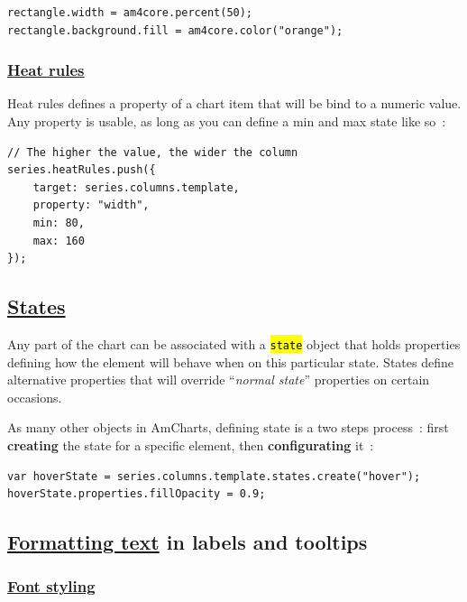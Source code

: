 \documentclass[a4paper,12pt,twoside]{book}
\let\OldTexttt\texttt
\renewcommand{\texttt}[1]{\OldTexttt{\hl{#1}}}
\begin{document}
\begin{lstlisting}
rectangle.width = am4core.percent(50);
rectangle.background.fill = am4core.color("orange");
\end{lstlisting}

				\subsubsection{\href{https://www.amcharts.com/docs/v4/concepts/series/\#Defining_a_heat_rule}{Heat rules}}\label{heat-rules}

Heat rules defines a property of a chart item that will be bind to a numeric value. Any property is usable, as long as you can define a min and max state like so~:

\begin{lstlisting}
// The higher the value, the wider the column
series.heatRules.push({
    target: series.columns.template,
    property: "width",
    min: 80,
    max: 160
});
\end{lstlisting}

			\subsection{\href{https://www.amcharts.com/docs/v4/concepts/states/}{States}}\label{states}

Any part of the chart can be associated with a \texttt{state} object that holds properties defining how the element will behave when on this particular state. States define alternative properties that will override ``\emph{normal state}'' properties on certain occasions.

As many other objects in AmCharts, defining state is a two steps process~: first \textbf{creating} the state for a specific element, then \textbf{configurating} it~:

\begin{lstlisting}
var hoverState = series.columns.template.states.create("hover");
hoverState.properties.fillOpacity = 0.9;
\end{lstlisting}

			\subsection{\href{https://www.amcharts.com/docs/v4/concepts/formatters/formatting-strings/}{Formatting text} in labels and tooltips}\label{formatting-text-in-labels-and-tooltips}

				\subsubsection{\href{https://www.amcharts.com/docs/v4/concepts/formatters/formatting-strings/\#Visual_formatting}{Font styling}}\label{font-styling}
\end{document}
